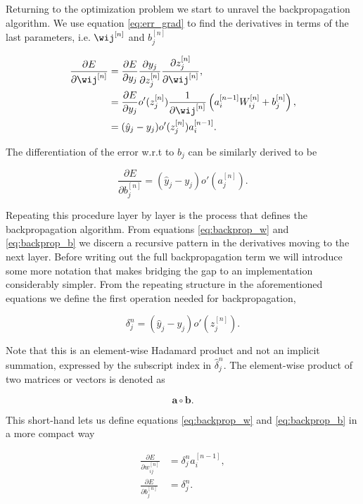 Returning to the optimization problem we start to unravel the backpropagation algorithm. We use equation \ref{eq:err_grad} to find the derivatives in terms of the last parameters, i.e. $\wij^{[n]}$ and $b_j^{[n]}$

\begin{align}
\frac{\partial E}{\partial \wij^{[n]}} &= 
\frac{\partial E}{\partial y_j} 
\frac{\partial y_j}{\partial z_j^{[n]}}
\frac{\partial z_j^{[n]}}{\partial \wij^{[n]}}, \\
&= \frac{\partial E}{\partial y_j} o'(z^{[n]}_j)
\frac{1}{\partial \wij^{[n]}} \left(a^{[n-1]}_iW^{[n]}_{ij} + b^{[n]}_j\right), \\
&= (\hat{y}_j - y_j)o'(z^{[n]}_j) a^{[n-1]}_i. \label{eq:backprop_w}
\end{align}

\noindent The differentiation of the error w.r.t to $b_j$ can be similarly derived to be 

\begin{equation}\label{eq:backprop_b}
\frac{\partial E}{\partial b_j^{[n]}}= (\hat{y}_j - y_j)o'(a^{[n]}_j).
\end{equation}

\noindent Repeating this procedure layer by layer is the process that defines the backpropagation algorithm. From equations \ref{eq:backprop_w} and \ref{eq:backprop_b} we discern a recursive pattern in the derivatives moving to the next layer. Before writing out the full backpropagation term we will introduce some more notation that makes bridging the gap to an implementation considerably simpler. From the repeating structure in the aforementioned equations we define the first operation needed for backpropagation,

\begin{equation}
\delta^n_j = (\hat{y}_j - y_j)o'(z_j^{[n]}).
\end{equation}

\noindent Note that this is an element-wise Hadamard product and not an implicit summation, expressed by the subscript index in $\hat{\delta}^n_j$.
The element-wise product of two matrices or vectors is denoted as  

\begin{equation}
\mathbf{a} \circ \mathbf{b}.
\end{equation}

\noindent This short-hand lets us define equations \ref{eq:backprop_w} and \ref{eq:backprop_b} in a more compact way

\begin{align}
\frac{\partial E}{\partial w_{ij}^{[n]}} &= \delta^n_j a^{[n-1]}_i,\\
\frac{\partial E}{\partial b_{j}^{[n]}} &= \delta^n_j.
\end{align} 

